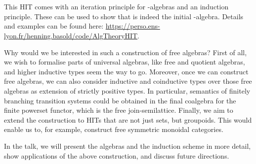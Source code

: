 \documentclass{easychair}
\begin{document}
\begin{code}
\AgdaSymbol{:}\AgdaSpace{}%
\AgdaSpace{}%
\sig\AgdaSpace{}%
\AgdaSpace{}%
\AgdaSpace{}%
\AgdaSpace{}%
\AgdaSymbol{)}\AgdaSpace{}%
\AgdaSpace{}%
\AgdaSpace{}%
\<%
\\
\>[6]%
\>[13]\AgdaSymbol{:}\AgdaSpace{}%
\AgdaSpace{}%
\AgdaSymbol{\{}\AgdaSpace{}%
\AgdaSymbol{\}}\AgdaSpace{}%
\AgdaSpace{}%
\AgdaSpace{}%
\AgdaSpace{}%
\AgdaSpace{}%
\AgdaSpace{}%
\AgdaSpace{}%
\AgdaSpace{}%
\AgdaOperator{\AgdaDatatype{==}}\AgdaSpace{}%
\AgdaSpace{}%
\<%
\\
%
\>[6]%
\>[13]\AgdaSymbol{:}\AgdaSpace{}%
\AgdaSpace{}%
\AgdaSymbol{(}\AgdaSpace{}%
\AgdaSymbol{)}\<%
\end{code}

This HIT comes with an iteration principle for -algebras and an
induction principle.
These can be used to show that  is indeed the initial
-algebra.
Details and examples can be found here:
\url{https://perso.ens-lyon.fr/henning.basold/code/AlgTheoryHIT}.

Why would we be interested in such a construction of free algebras?
First of all, we wish to formalise parts of universal algebras, like free and
quotient algebras, and higher inductive types seem the way to go.
Moreover, once we can construct free algebras, we can also consider inductive
and coinductive types over those free algebras as extension of strictly
positive types.
In particular, semantics of finitely branching transition systems could be
obtained in the final coalgebra for the finite powerset functor, which is
the free join-semilattice.
Finally, we aim to extend the construction to HITs that are not just sets, but
groupoids.
This would enable us to, for example, construct free symmetric monoidal
categories.

In the talk, we will present the algebras and the induction scheme in more
detail, show applications of the above construction, and discuss future
directions.


%
%
%


\end{document}
